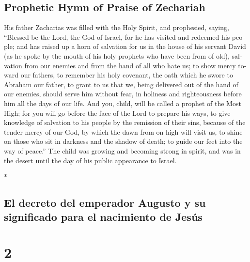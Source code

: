 \begin{paracol}{2}
\begin{otherlanguage}{english}
\hypertarget{prophetic-hymn-of-praise-of-zechariah}{%
\subsection{Prophetic Hymn of Praise of
Zechariah}\label{prophetic-hymn-of-praise-of-zechariah}}

 His father Zacharias was filled with the Holy Spirit,
and prophesied, saying,  ``Blessed be the Lord, the God
of Israel, for he has visited and redeemed his people; 
and has raised up a horn of salvation for us in the house of his servant
David  (as he spoke by the mouth of his holy prophets who
have been from of old),  salvation from our enemies and
from the hand of all who hate us;  to show mercy toward
our fathers, to remember his holy covenant,  the oath
which he swore to Abraham our father,  to grant to us
that we, being delivered out of the hand of our enemies, should serve
him without fear,  in holiness and righteousness before
him all the days of our life.  And you, child, will be
called a prophet of the Most High; for you will go before the face of
the Lord to prepare his ways,  to give knowledge of
salvation to his people by the remission of their sins, 
because of the tender mercy of our God, by which the dawn from on high
will visit us,  to shine on those who sit in darkness and
the shadow of death; to guide our feet into the way of peace.''
 The child was growing and becoming strong in spirit, and
was in the desert until the day of his public appearance to Israel.

\end{otherlanguage}

\switchcolumn[0]*

\hypertarget{el-decreto-del-emperador-augusto-y-su-significado-para-el-nacimiento-de-jesuxfas}{%
\subsection{El decreto del emperador Augusto y su significado para el
nacimiento de
Jesús}\label{el-decreto-del-emperador-augusto-y-su-significado-para-el-nacimiento-de-jesuxfas}}

\hypertarget{section-2}{%
\section{2}\label{section-2}}


\end{paracol}
